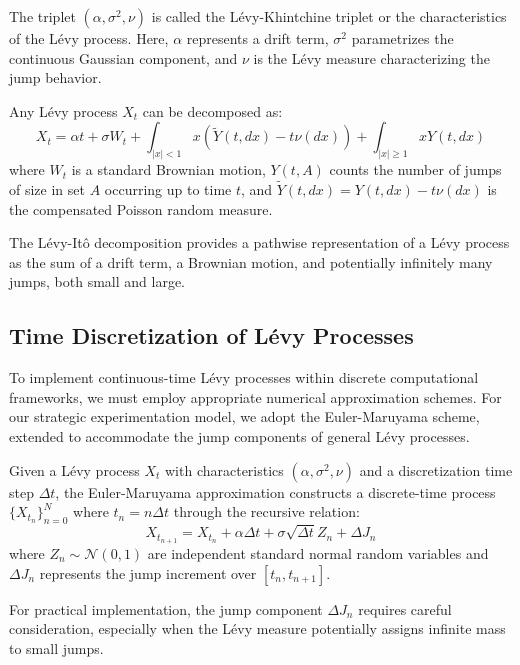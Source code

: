 The triplet $(\alpha, \sigma^2, \nu)$ is called the Lévy-Khintchine triplet or the characteristics of the Lévy process. Here, $\alpha$ represents a drift term, $\sigma^2$ parametrizes the continuous Gaussian component, and $\nu$ is the Lévy measure characterizing the jump behavior.

\begin{theorem}
    Any Lévy process $X_t$ can be decomposed as:
    \begin{equation}
        X_t = \alpha t + \sigma W_t + \int_{|x|<1} x (\tilde{Y}(t, dx) - t\nu(dx)) + \int_{|x|\geq 1} x Y(t, dx)
    \end{equation}
    where $W_t$ is a standard Brownian motion, $Y(t, A)$ counts the number of jumps of size in set $A$ occurring up to time $t$, and $\tilde{Y}(t, dx) = Y(t, dx) - t\nu(dx)$ is the compensated Poisson random measure.
\end{theorem}

The Lévy-Itô decomposition provides a pathwise representation of a Lévy process as the sum of a drift term, a Brownian motion, and potentially infinitely many jumps, both small and large.

\subsection{Time Discretization of Lévy Processes}
\label{appendix:levy_discretization_methods}

To implement continuous-time Lévy processes within discrete computational frameworks, we must employ appropriate numerical approximation schemes. For our strategic experimentation model, we adopt the Euler-Maruyama scheme, extended to accommodate the jump components of general Lévy processes.

\begin{definition}
    Given a Lévy process $X_t$ with characteristics $(\alpha, \sigma^2, \nu)$ and a discretization time step $\Delta t$, the Euler-Maruyama approximation constructs a discrete-time process $\{X_{t_n}\}_{n=0}^N$ where $t_n = n\Delta t$ through the recursive relation:
    \begin{equation}
        X_{t_{n+1}} = X_{t_n} + \alpha \Delta t + \sigma\sqrt{\Delta t}Z_n + \Delta J_n
    \end{equation}
    where $Z_n \sim \mathcal{N}(0,1)$ are independent standard normal random variables and $\Delta J_n$ represents the jump increment over $[t_n, t_{n+1}]$.
\end{definition}
\iffalse
    For practical implementation, the jump component $\Delta J_n$ requires careful consideration, especially when the Lévy measure potentially assigns infinite mass to small jumps.

